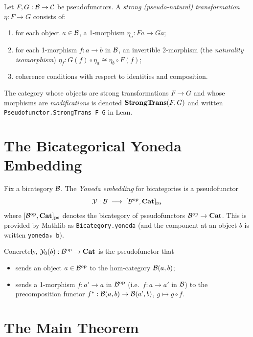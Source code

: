 \documentclass[12pt]{article}
\begin{document}
\begin{definition}
  Let $F, G : \mathcal{B} \to \mathcal{C}$ be pseudofunctors.  A \emph{strong (pseudo-natural)
  transformation} $\eta : F \to G$ consists of:
  \begin{enumerate}[label=(\roman*)]
    \item for each object $a \in \mathcal{B}$, a 1-morphism $\eta_a : Fa \to Ga$;
    \item for each 1-morphism $f : a \to b$ in $\mathcal{B}$, an invertible 2-morphism
          (the \emph{naturality isomorphism})
          $\eta_f : G(f) \circ \eta_a \cong \eta_b \circ F(f)$;
    \item coherence conditions with respect to identities and composition.
  \end{enumerate}
\end{definition}

The category whose objects are strong transformations $F \to G$ and whose morphisms are
\emph{modifications} is denoted $\mathbf{StrongTrans}(F, G)$ and written
\lstinline{Pseudofunctor.StrongTrans F G} in Lean.

\section{The Bicategorical Yoneda Embedding}\label{sec:yoneda-embedding}

Fix a bicategory $\mathcal{B}$.  The \emph{Yoneda embedding} for bicategories is a pseudofunctor
\[
  \mathcal{Y} : \mathcal{B} \;\longrightarrow\; [\mathcal{B}^{\mathrm{op}}, \mathbf{Cat}]_{\mathrm{ps}}
\]
where $[\mathcal{B}^{\mathrm{op}}, \mathbf{Cat}]_{\mathrm{ps}}$ denotes the bicategory of pseudofunctors
$\mathcal{B}^{\mathrm{op}} \to \mathbf{Cat}$.  This is provided by Mathlib as \lstinline{Bicategory.yoneda} (and
the component at an object $b$ is written \lstinline{yoneda₀ b}).

Concretely, $\mathcal{Y}_0(b) : \mathcal{B}^{\mathrm{op}} \to \mathbf{Cat}$ is the pseudofunctor that
\begin{itemize}
  \item sends an object $a \in \mathcal{B}^{\mathrm{op}}$ to the hom-category $\mathcal{B}(a, b)$;
  \item sends a 1-morphism $f : a' \to a$ in $\mathcal{B}^{\mathrm{op}}$ (i.e.\ $f : a \to a'$ in $\mathcal{B}$)
        to the precomposition functor $f^* : \mathcal{B}(a, b) \to \mathcal{B}(a', b)$,
        $g \mapsto g \circ f$.
\end{itemize}

\section{The Main Theorem}\label{sec:main}
\end{document}

